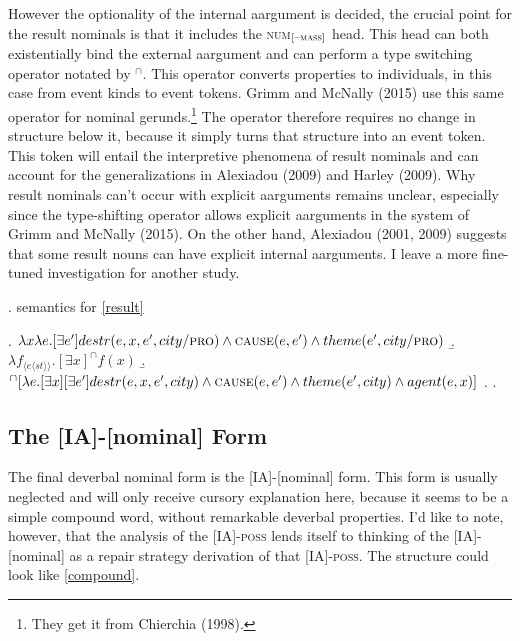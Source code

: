 \documentclass[12pt]{article}
\newcommand*{\textsub}[1]{\ensuremath{_\textrm{{\scriptsize #1}}}}
\begin{document}
However the optionality of the internal aargument is decided, the crucial point for the result nominals is that it includes the \textsc{num}\textsub{[--\textsc{mass}]} head. This head can both existentially bind the external aargument and can perform a type switching operator notated by $^{\cap}$. This operator converts properties to individuals, in this case from event kinds to event tokens. Grimm and McNally (2015) use this same operator for nominal gerunds.\footnote{ They get it from Chierchia (1998).} The operator therefore requires no change in structure below it, because it simply turns that structure into an event token. This token will entail the interpretive phenomena of result nominals and can account for the generalizations in Alexiadou (2009) and Harley (2009). Why result nominals can't occur with explicit aarguments remains unclear, especially since the type-shifting operator allows explicit aarguments in the system of Grimm and McNally (2015). On the other hand, Alexiadou (2001, 2009) suggests that some result nouns can have explicit internal aarguments. I leave a more fine-tuned investigation for another study.

\singlespacing

\ex. semantics for \ref{result}

\a. \begin{math}\lambda x \lambda e . [\exists e'] destr(e,x,e',city/\textsc{pro}) \land \textsc{cause}(e,e') \land theme(e',city/\textsc{pro}) \end{math}
\b. \begin{math} \lambda f_{\langle e \langle st \rangle \rangle } . [\exists x] ^{\cap}f(x) \end{math}
\b. \begin{math}^{\cap}[\lambda e . [\exists x][\exists e'] destr(e,x,e',city) \land \textsc{cause}(e,e') \land theme(e',city) \land agent(e,x)] \end{math}
\z. \z. \par

\doublespacing

\subsection{The [IA]-[nominal] Form}\label{strucs5}

The final deverbal nominal form is the [IA]-[nominal] form. This form is usually neglected and will only receive cursory explanation here, because it seems to be a simple compound word, without remarkable deverbal properties. I'd like to note, however, that the analysis of the [IA]-\textsc{poss} lends itself to thinking of the [IA]-[nominal] as a repair strategy derivation of that [IA]-\textsc{poss}. The structure could look like \ref{compound}.
\end{document}
